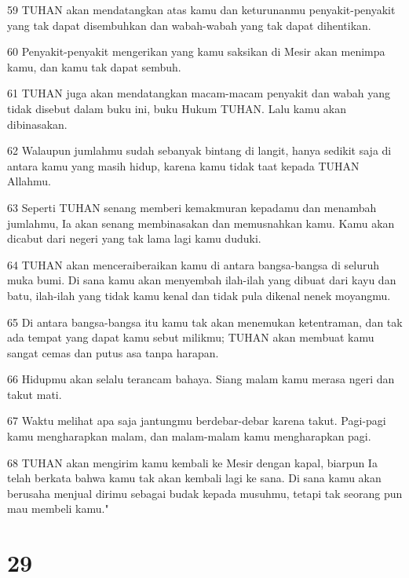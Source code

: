 \par 59 TUHAN akan mendatangkan atas kamu dan keturunanmu penyakit-penyakit yang tak dapat disembuhkan dan wabah-wabah yang tak dapat dihentikan.
\par 60 Penyakit-penyakit mengerikan yang kamu saksikan di Mesir akan menimpa kamu, dan kamu tak dapat sembuh.
\par 61 TUHAN juga akan mendatangkan macam-macam penyakit dan wabah yang tidak disebut dalam buku ini, buku Hukum TUHAN. Lalu kamu akan dibinasakan.
\par 62 Walaupun jumlahmu sudah sebanyak bintang di langit, hanya sedikit saja di antara kamu yang masih hidup, karena kamu tidak taat kepada TUHAN Allahmu.
\par 63 Seperti TUHAN senang memberi kemakmuran kepadamu dan menambah jumlahmu, Ia akan senang membinasakan dan memusnahkan kamu. Kamu akan dicabut dari negeri yang tak lama lagi kamu duduki.
\par 64 TUHAN akan menceraiberaikan kamu di antara bangsa-bangsa di seluruh muka bumi. Di sana kamu akan menyembah ilah-ilah yang dibuat dari kayu dan batu, ilah-ilah yang tidak kamu kenal dan tidak pula dikenal nenek moyangmu.
\par 65 Di antara bangsa-bangsa itu kamu tak akan menemukan ketentraman, dan tak ada tempat yang dapat kamu sebut milikmu; TUHAN akan membuat kamu sangat cemas dan putus asa tanpa harapan.
\par 66 Hidupmu akan selalu terancam bahaya. Siang malam kamu merasa ngeri dan takut mati.
\par 67 Waktu melihat apa saja jantungmu berdebar-debar karena takut. Pagi-pagi kamu mengharapkan malam, dan malam-malam kamu mengharapkan pagi.
\par 68 TUHAN akan mengirim kamu kembali ke Mesir dengan kapal, biarpun Ia telah berkata bahwa kamu tak akan kembali lagi ke sana. Di sana kamu akan berusaha menjual dirimu sebagai budak kepada musuhmu, tetapi tak seorang pun mau membeli kamu."

\chapter{29}

